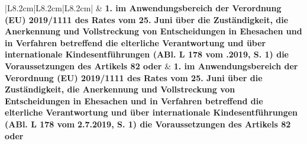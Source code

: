 \documentclass[10pt,a4paper,landscape]{article}
\begin{document}
\begin{longtable}{|L{8.2cm}|L{8.2cm}|L{8.2cm}|}
\hhline{|---|}
 & \textbf{1.   \newline im Anwendungsbereich der Verordnung  \newline (EU) 2019/1111 des Rates vom 25. Juni   über die Zuständigkeit, die  \newline Anerkennung und Vollstreckung von  \newline Entscheidungen in Ehesachen und in  \newline Verfahren betreffend die elterliche  \newline Verantwortung und über internationale  \newline Kindesentführungen (ABl. L 178 vom  .2019, S. 1) die Voraussetzungen des  \newline Artikels 82 oder } & \textbf{1.   \newline im Anwendungsbereich der Verordnung  \newline (EU) 2019/1111 des Rates vom 25. Juni   über die Zuständigkeit, die  \newline Anerkennung und Vollstreckung von  \newline Entscheidungen in Ehesachen und in  \newline Verfahren betreffend die elterliche  \newline Verantwortung und über internationale  \newline Kindesentführungen (ABl. L 178 vom } \textbf{2.7.2019, S. 1) die Voraussetzungen des  \newline Artikels 82 oder } \\
\hhline{|---|}

\end{longtable}
\end{document}
